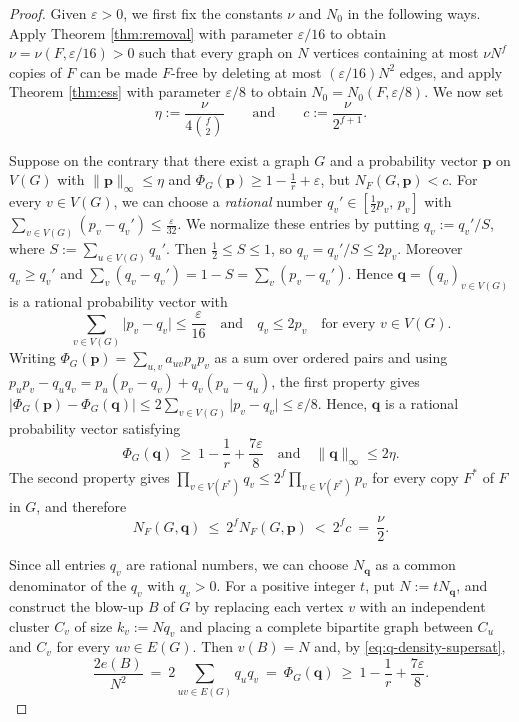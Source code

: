 \documentclass[11pt, a4paper]{article}
\theoremstyle{definition}
\theoremstyle{plain}
\renewcommand{\le}{\leqslant}
\renewcommand{\ge}{\geqslant}
\begin{document}
\begin{proof}  
Given $\varepsilon>0$, we first fix the constants $\nu$ and $N_0$ in the following ways. Apply Theorem
\ref{thm:removal} with parameter $\varepsilon/16$ to obtain
$\nu=\nu(F,\varepsilon/16)>0$ such that every graph on $N$ vertices
containing at most $\nu N^f$ copies of $F$ can be made $F$-free by
deleting at most $(\varepsilon/16)N^2$ edges, and apply Theorem
\ref{thm:ess} with parameter $\varepsilon/8$ to obtain
$N_0=N_0(F,\varepsilon/8)$. We now set 
\[
  \eta:=\frac{\nu}{4\binom f2}
  \qquad \text{and} \qquad
  c:=\frac{\nu}{2^{f+1}}.
\]


Suppose on the contrary that there exist a graph $G$ and a probability
vector $\bm p$ on $V(G)$ with $\lVert\bm p\rVert_\infty\le\eta$ and 
$\Phi_G(\bm p)\ge 1-\frac1r+\varepsilon$, but $N_F(G,\bm p)<c$. For every
$v\in V(G)$, we can choose a {\it rational} number $q_v'\in[\tfrac12 p_v,\,p_v]$ with
$\sum_{v\in V(G)}(p_v-q_v')\le\frac{\varepsilon}{32}$. We normalize these entries by putting 
$q_v:=q_v'/S$, where $S:=\sum_{u\in V(G)}q_u'$. Then $\frac12 \le S \le 1$, so
$q_v= q_v'/S\le 2p_v$. Moreover $q_v\ge q_v'$ and
$\sum_v(q_v-q_v')=1-S=\sum_v(p_v-q_v')$. Hence $\bm q=(q_v)_{v\in V(G)}$
is a rational probability vector with
\[
  \sum_{v\in V(G)}\lvert p_v-q_v\rvert\le\frac{\varepsilon}{16}
  \quad\text{and}\quad
  q_v\le 2p_v \quad\text{for every } v\in V(G).
\]
Writing $\Phi_G(\bm p)=\sum_{u,v}a_{uv}p_up_v$ as a sum over ordered pairs and using $p_u p_v-q_u q_v = 
p_u(p_v-q_v) + q_v(p_u-q_u)$, the first property gives $\lvert \Phi_G(\bm p)-\Phi_G(\bm q)\rvert\le 2\sum_{v\in V(G)}\lvert p_v-q_v\rvert\le \varepsilon/8$. Hence, $\bm{q}$ is a rational probability vector  satisfying
\begin{equation}\label{eq:q-density-supersat}
  \Phi_G(\bm q)\ \ge\ 1-\frac1r+\frac{7\varepsilon}{8} \quad \text{and} \quad 
  \lVert\bm q\rVert_\infty\le2\eta. 
\end{equation}
 The second property gives
$\prod_{v\in V(F^*)}q_v\le 2^{f}\prod_{v\in V(F^*)}p_v$ for every copy
$F^*$ of $F$ in $G$, and therefore
\begin{equation}\label{eq:NF-transfer}
  N_F(G,\bm q)\ \le\ 2^{f}N_F(G,\bm p)\ <\ 2^{f}c\ =\ \frac{\nu}{2}.
\end{equation}

Since all entries $q_v$ are rational numbers,  
we can choose $N_{\bm q}$ as a common denominator of the $q_v$ with $q_v>0$. For
a positive integer $t$, put $N:=tN_{\bm q}$, and construct the blow-up
$B$ of $G$ by replacing each vertex $v$ with an independent cluster
$C_v$ of size $k_v:=Nq_v$ and placing a complete bipartite graph
between $C_u$ and $C_v$ for every $uv\in E(G)$. Then $v(B)=N$ and, by
\eqref{eq:q-density-supersat},
\[
  \frac{2e(B)}{N^2}\ = \  2\sum_{uv\in E(G)} q_u q_v 
 \ = \ \Phi_G(\bm q)\ \ge\ 1-\frac1r+\frac{7\varepsilon}{8}.
\]


\end{proof}
\end{document}
